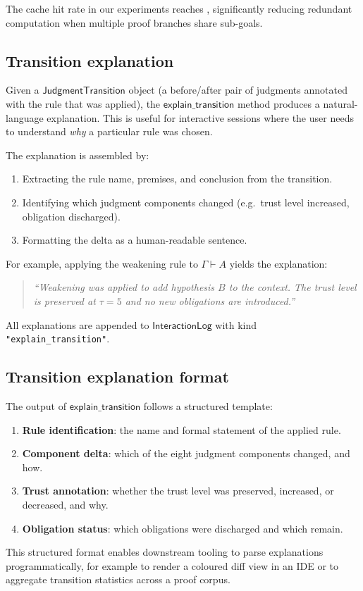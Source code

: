 \documentclass[11pt]{article}
\newcommand{\IL}{\ensuremath{\mathsf{InteractionLog}}}
\newcommand{\explainTrans}{\ensuremath{\mathsf{explain\_transition}}}
\begin{document}
The cache hit rate in our experiments reaches
\ppLXXXVIIcacheHitRate{}, significantly reducing redundant
computation when multiple proof branches share sub-goals.

\subsection{Transition explanation}\label{ssec:explain}

Given a $\mathsf{JudgmentTransition}$ object (a before/after pair
of judgments annotated with the rule that was applied), the
$\explainTrans$ method produces a natural-language explanation.
This is useful for interactive sessions where the user needs to
understand \emph{why} a particular rule was chosen.

The explanation is assembled by:
\begin{enumerate}
  \item Extracting the rule name, premises, and conclusion from the
    transition.
  \item Identifying which judgment components changed (e.g.\ trust
    level increased, obligation discharged).
  \item Formatting the delta as a human-readable sentence.
\end{enumerate}

For example, applying the weakening rule to
$\Gamma \vdash A$ yields the explanation:
\begin{quote}
  \itshape
  ``Weakening was applied to add hypothesis $B$ to the context.
  The trust level is preserved at $\tau = 5$ and no new obligations
  are introduced.''
\end{quote}

\noindent
All explanations are appended to $\IL$ with kind
\texttt{"explain\_transition"}.

\subsection{Transition explanation format}\label{ssec:explain-format}

The output of $\explainTrans$ follows a structured template:
\begin{enumerate}
  \item \textbf{Rule identification}: the name and formal
    statement of the applied rule.
  \item \textbf{Component delta}: which of the eight judgment
    components changed, and how.
  \item \textbf{Trust annotation}: whether the trust level was
    preserved, increased, or decreased, and why.
  \item \textbf{Obligation status}: which obligations were
    discharged and which remain.
\end{enumerate}
This structured format enables downstream tooling to parse
explanations programmatically, for example to render a coloured
diff view in an IDE or to aggregate transition statistics across
a proof corpus.
\end{document}
